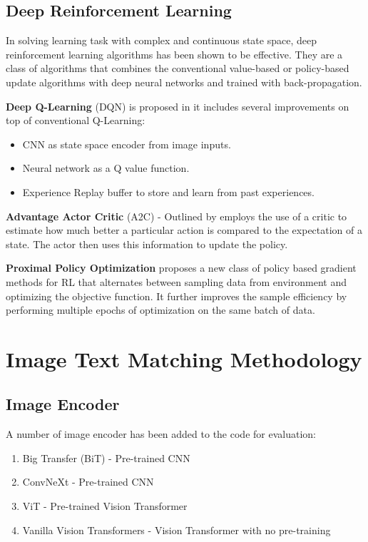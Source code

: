 \documentclass[conference]{IEEEtran}
\begin{document}
\subsection{Deep Reinforcement Learning}

In solving learning task with complex and continuous state space, deep reinforcement learning algorithms has been shown to be effective. They are a class of algorithms that combines the conventional value-based or policy-based update algorithms with deep neural networks and trained with back-propagation.

\textbf{Deep Q-Learning} (DQN) is proposed in \cite{mnihPlayingAtariDeep2013} it includes several improvements on top of conventional Q-Learning:

\begin{itemize}
    \item CNN as state space encoder from image inputs.
    \item Neural network as a Q value function.
    \item Experience Replay buffer to store and learn from past experiences.
\end{itemize}

\textbf{Advantage Actor Critic} (A2C) - Outlined by \cite{plaatDeepReinforcementLearning2022} employs the use of a critic to estimate how much better a particular action is compared to the expectation of a state. The actor then uses this information to update the policy.

\textbf{Proximal Policy Optimization} \cite{schulmanProximalPolicyOptimization2017} proposes a new class of policy based gradient methods for RL that alternates between sampling data from environment and optimizing the objective function. It further improves the sample efficiency by performing multiple epochs of optimization on the same batch of data.

\section{Image Text Matching Methodology}

\subsection{Image Encoder}

A number of image encoder has been added to the code for evaluation:

\begin{enumerate}
    \item Big Transfer (BiT) - Pre-trained CNN
    \item ConvNeXt - Pre-trained CNN
    \item ViT - Pre-trained Vision Transformer
    \item Vanilla Vision Transformers - Vision Transformer with no pre-training
\end{enumerate}
\end{document}
